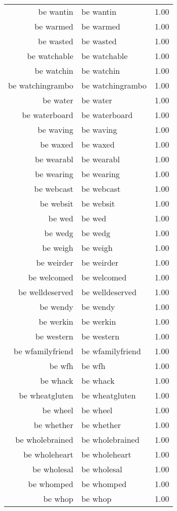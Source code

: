 \begin{table}[ht]
\begin{tabular}{rlr}
  be wantin & be wantin & 1.00 \\ 
  be warmed & be warmed & 1.00 \\ 
  be wasted & be wasted & 1.00 \\ 
  be watchable & be watchable & 1.00 \\ 
  be watchin & be watchin & 1.00 \\ 
  be watchingrambo & be watchingrambo & 1.00 \\ 
  be water & be water & 1.00 \\ 
  be waterboard & be waterboard & 1.00 \\ 
  be waving & be waving & 1.00 \\ 
  be waxed & be waxed & 1.00 \\ 
  be wearabl & be wearabl & 1.00 \\ 
  be wearing & be wearing & 1.00 \\ 
  be webcast & be webcast & 1.00 \\ 
  be websit & be websit & 1.00 \\ 
  be wed & be wed & 1.00 \\ 
  be wedg & be wedg & 1.00 \\ 
  be weigh & be weigh & 1.00 \\ 
  be weirder & be weirder & 1.00 \\ 
  be welcomed & be welcomed & 1.00 \\ 
  be welldeserved & be welldeserved & 1.00 \\ 
  be wendy & be wendy & 1.00 \\ 
  be werkin & be werkin & 1.00 \\ 
  be western & be western & 1.00 \\ 
  be wfamilyfriend & be wfamilyfriend & 1.00 \\ 
  be wfh & be wfh & 1.00 \\ 
  be whack & be whack & 1.00 \\ 
  be wheatgluten & be wheatgluten & 1.00 \\ 
  be wheel & be wheel & 1.00 \\ 
  be whether & be whether & 1.00 \\ 
  be wholebrained & be wholebrained & 1.00 \\ 
  be wholeheart & be wholeheart & 1.00 \\ 
  be wholesal & be wholesal & 1.00 \\ 
  be whomped & be whomped & 1.00 \\ 
  be whop & be whop & 1.00 \\ 

\end{tabular}
\end{table}
